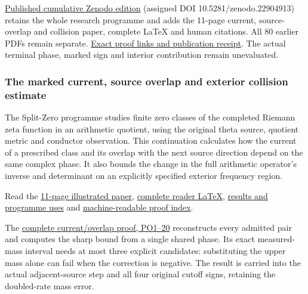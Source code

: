 \documentclass[
]{article}
\begin{document}
\href{https://zenodo.org/records/22904913}{Published cumulative Zenodo
edition} (assigned DOI 10.5281/zenodo.22904913) retains the whole
research programme and adds the 11-page current, source-overlap and
collision paper, complete LaTeX and human citations. All 80 earlier PDFs
remain separate.
\href{https://github.com/KokunoYumeto/zeta-function-research-reader/blob/main/workbenches/splitzero-tandem/continuations/20260922-current-collision-publication/README.md}{Exact
proof links and publication receipt}. The actual terminal phase, marked
sign and interior contribution remain unevaluated.

\subsubsection{The marked current, source overlap and exterior collision
estimate}\label{the-marked-current-source-overlap-and-exterior-collision-estimate}

The Split-Zero programme studies finite zero classes of the completed
Riemann zeta function in an arithmetic quotient, using the original
theta source, quotient metric and conductor observation. This
continuation calculates how the current of a prescribed class and its
overlap with the next source direction depend on the same complex phase.
It also bounds the change in the full arithmetic operator's inverse and
determinant on an explicitly specified exterior frequency region.

Read the
\href{https://github.com/KokunoYumeto/zeta-function-research-reader/blob/main/workbenches/splitzero-tandem/continuations/20260922-current-collision/CURRENT_AND_COLLISION.pdf}{11-page
illustrated paper},
\href{https://github.com/KokunoYumeto/zeta-function-research-reader/blob/main/workbenches/splitzero-tandem/continuations/20260922-current-collision/CURRENT_AND_COLLISION.tex}{complete
reader LaTeX},
\href{https://github.com/KokunoYumeto/zeta-function-research-reader/blob/main/workbenches/splitzero-tandem/continuations/20260922-current-collision/RESULTS_20260922_030.md}{results
and programme uses} and
\href{https://github.com/KokunoYumeto/zeta-function-research-reader/blob/main/workbenches/splitzero-tandem/continuations/20260922-current-collision/PUBLICATION_INDEX.json}{machine-readable
proof index}.

The
\href{https://github.com/KokunoYumeto/zeta-function-research-reader/blob/main/workbenches/splitzero-tandem/continuations/20260922-current-collision/PHASE_OVERLAP_PROOF.md\#L29}{complete
current/overlap proof, PO1--20} reconstructs every admitted pair and
computes the sharp bound from a single shared phase. Its exact
measured-mass interval needs at most three explicit candidates:
substituting the upper mass alone can fail when the correction is
negative. The result is carried into the actual adjacent-source step and
all four original cutoff signs, retaining the doubled-rate mass error.
\end{document}
